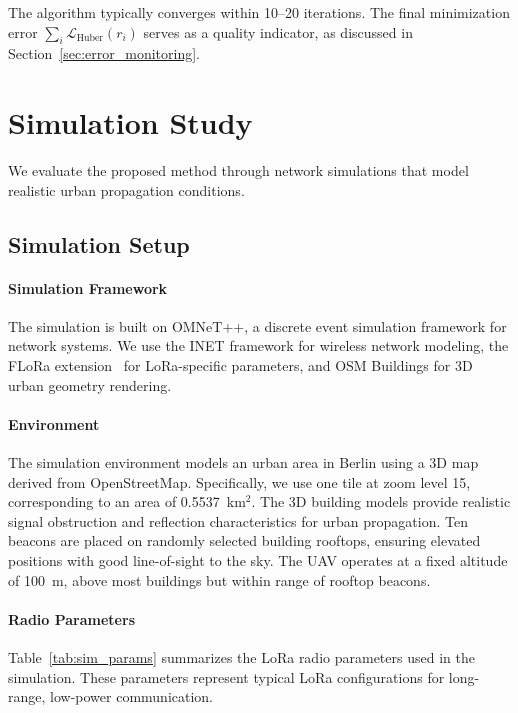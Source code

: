 \documentclass[master,final,11pt]{iscs-thesis}
\begin{document}
The algorithm typically converges within 10--20 iterations.
The final minimization error $\sum_i \mathcal{L}_{\text{Huber}}(r_i)$ serves as a quality indicator, as discussed in Section~\ref{sec:error_monitoring}.

\section{Simulation Study}
\label{sec:uav_simulation}

We evaluate the proposed method through network simulations that model realistic urban propagation conditions.

\subsection{Simulation Setup}

\paragraph{Simulation Framework}
The simulation is built on OMNeT++, a discrete event simulation framework for network systems.
We use the INET framework for wireless network modeling, the FLoRa extension~\cite{slabicki2018flora} for LoRa-specific parameters, and OSM Buildings for 3D urban geometry rendering.

\paragraph{Environment}
The simulation environment models an urban area in Berlin using a 3D map derived from OpenStreetMap.
Specifically, we use one tile at zoom level 15, corresponding to an area of 0.5537~km$^2$.
The 3D building models provide realistic signal obstruction and reflection characteristics for urban propagation.
Ten beacons are placed on randomly selected building rooftops, ensuring elevated positions with good line-of-sight to the sky.
The UAV operates at a fixed altitude of 100~m, above most buildings but within range of rooftop beacons.

\paragraph{Radio Parameters}
Table~\ref{tab:sim_params} summarizes the LoRa radio parameters used in the simulation.
These parameters represent typical LoRa configurations for long-range, low-power communication.
\end{document}

